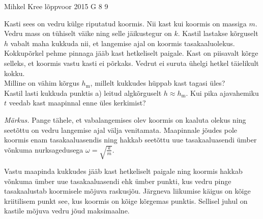 {Mihkel Kree} %
{lõppvoor} %
{2015} %
{G 8} %
{9} %
{
\ifStatement
Kasti sees on vedru külge riputatud koormis. Nii kast kui koormis on massiga $m$. Vedru mass on tühiselt väike ning selle jäikustegur on $k$. Kastil lastakse kõrguselt $h$ vabalt maha kukkuda nii, et langemise ajal on koormis tasakaaluolekus. Kokkupõrkel pehme pinnaga jääb kast hetkeliselt paigale. Kast on piisavalt kõrge selleks, et koormis vastu kasti ei põrkaks. Vedrut ei suruta ühelgi hetkel täielikult kokku.\\
\osa Milline on vähim kõrgus $h_\text{m}$, millelt kukkudes hüppab kast tagasi üles?\\
\osa Kastil lasti kukkuda punktis a) leitud algkõrguselt $h\approx h_\text{m}$. Kui pika ajavahemiku $t$ veedab kast maapinnal enne üles kerkimist? 

\emph{Märkus.} Pange tähele, et vabalangemises olev koormis on kaaluta olekus ning seetõttu on vedru langemise ajal välja venitamata. Maapinnale jõudes pole koormis enam tasakaaluasendis ning hakkab seetõttu uue tasakaaluasendi ümber võnkuma nurksagedusega $\omega =\sqrt{\frac{k}{m}}$.
\fi


\ifHint
Vastu maapinda kukkudes jääb kast hetkeliselt paigale ning koormis hakkab võnkuma ümber uue tasakaaluasendi ehk ümber punkti, kus vedru pinge tasakaalustab koormisele mõjuva raskusjõu. Järgneva liikumise käigus on kõige kriitilisem punkt see, kus koormis on kõige kõrgemas punktis. Sellisel juhul on kastile mõjuva vedru jõud maksimaalne.
\fi


}
